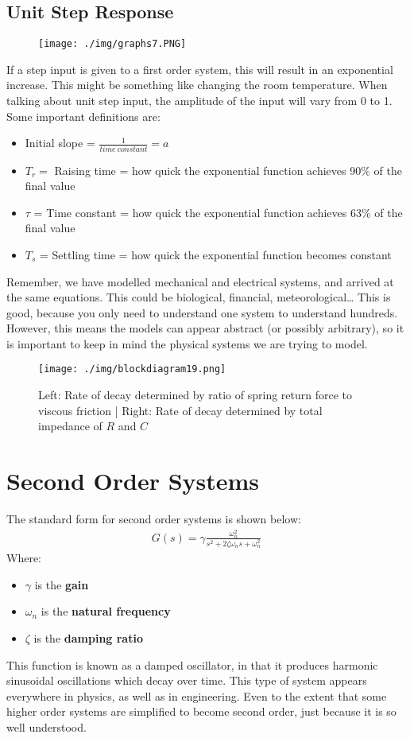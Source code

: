\subsection{Unit Step Response}
\begin{figure}[H]
  \centering
  \texttt{[image: ./img/graphs7.PNG]}
\end{figure}
If a step input is given to a first order system, this will result in an exponential increase. This might be something like changing the room temperature. When talking about unit step input, the amplitude of the input will vary from 0 to 1. Some important definitions are:
\begin{itemize}
  \item Initial slope = $\frac{1}{time \ constant} = a$
  \item $T_r =$ Raising time = how quick the exponential function achieves 90\% of the final value
  \item $\tau$ = Time constant = how quick the exponential function achieves 63\% of the final value
  \item $T_s$ = Settling time = how quick the exponential function becomes constant
\end{itemize}
Remember, we have modelled mechanical and electrical systems, and arrived at the same equations. This could be biological, financial, meteorological… This is good, because you only need to understand one system to understand hundreds. However, this means the models can appear abstract (or possibly arbitrary), so it is important to keep in mind the physical systems we are trying to model.
\begin{figure}[H]
  \centering
  \texttt{[image: ./img/blockdiagram19.png]}
  \caption{Left: Rate of decay determined by ratio of spring return force to viscous friction | Right: Rate of decay determined by total impedance of $R$ and $C$}
\end{figure}
\section{Second Order Systems}
The standard form for second order systems is shown below:
\begin{gather}
  G(s) = \gamma \frac{\omega_n^2}{s^2 + 2\zeta \omega_n s + \omega_n^2}
\end{gather}
Where:
\begin{itemize}
  \item $\gamma$ is the \textbf{gain}
  \item $\omega_n$ is the \textbf{natural frequency}
  \item $\zeta$ is the \textbf{damping ratio}
\end{itemize}
This function is known as a damped oscillator, in that it produces harmonic sinusoidal oscillations which decay over time. This type of system appears everywhere in physics, as well as in engineering. Even to the extent that some higher order systems are simplified to become second order, just because it is so well understood.

